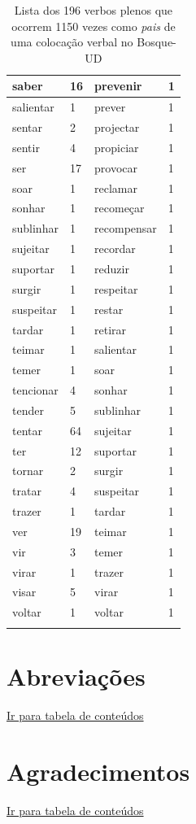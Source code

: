\documentclass[output=paper,colorlinks,citecolor=brown]{langscibook}
\begin{document}
\begin{longtable}{ p{3cm} | p{1cm} | p{3cm} | p{1cm} }
		saber & 16 & prevenir & 1\\\hline
		salientar & 1 & prever & 1\\\hline
		sentar & 2 & projectar & 1\\\hline
		sentir & 4 & propiciar & 1\\\hline
		ser & 17 & provocar & 1\\\hline
		soar & 1 & reclamar & 1\\\hline
		sonhar & 1 & recomeçar & 1\\\hline
		sublinhar & 1 & recompensar & 1\\\hline
		sujeitar & 1 & recordar & 1\\\hline
		suportar & 1 & reduzir & 1\\\hline
		surgir & 1 & respeitar & 1\\\hline
		suspeitar & 1 & restar & 1\\\hline
		tardar & 1 & retirar & 1\\\hline
		teimar & 1 & salientar & 1\\\hline
		temer & 1 & soar & 1\\\hline
		tencionar & 4 & sonhar & 1\\\hline
		tender & 5 & sublinhar & 1\\\hline
		tentar & 64 & sujeitar & 1\\\hline
		ter & 12 & suportar & 1\\\hline
		tornar & 2 & surgir & 1\\\hline
		tratar & 4 & suspeitar & 1\\\hline
		trazer & 1 & tardar & 1\\\hline
		ver & 19 & teimar & 1\\\hline
		vir & 3 & temer & 1\\\hline
		virar & 1 & trazer & 1\\\hline
		visar & 5 & virar & 1\\\hline
		voltar & 1 & voltar & 1\\\hline
		\caption{Lista dos 196 verbos plenos que ocorrem 1150 vezes como \emph{pais} de uma colocação verbal no Bosque-UD}
		\label{tab:naolocverbal}
	\end{longtable}

	
\chapter*{Abreviações}

\hyperlink{toc}{Ir para tabela de conteúdos\\}



\chapter*{Agradecimentos}

\hyperlink{toc}{Ir para tabela de conteúdos\\}



\printbibliography[heading=subbibliography,notkeyword=this]
\end{document}
